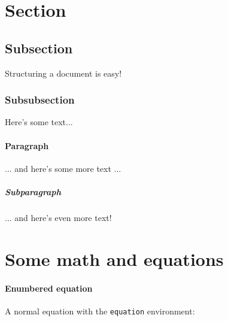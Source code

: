 \documentclass{article}
\begin{document}
\doublespacing          %

\maketitle
\newpage

\tableofcontents
\newpage

\listoffigures
\newpage

\listoftables
\newpage

\singlespacing

\section{Section}

\HelloWorld

\subsection{Subsection}

Structuring a document is easy!

\subsubsection{Subsubsection}

Here's some text...

\paragraph{Paragraph}

... and here's some more text ...

\subparagraph{Subparagraph}

... and here's even more text!

\section{Some math and equations}

\paragraph{Enumbered equation}

A normal equation with the \texttt{equation} environment:
\end{document}
